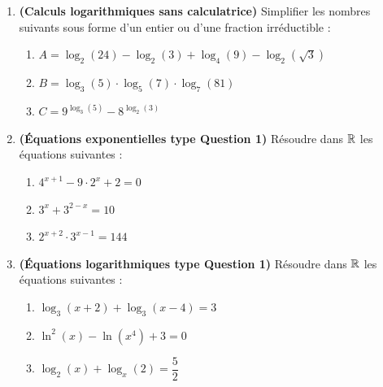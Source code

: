 \begin{enumerate}[label=\textbf{Exercice 3.\arabic* :}, leftmargin=*]
    \item \textbf{(Calculs logarithmiques sans calculatrice)} Simplifier les nombres suivants sous forme d'un entier ou d'une fraction irréductible :
    \begin{enumerate}[label=(\alph*)]
        \item $A = \log_2(24) - \log_2(3) + \log_4(9) - \log_2(\sqrt{3})$
        \item $B = \log_3(5)\cdot\log_5(7)\cdot\log_7(81)$
        \item $C = 9^{\log_3(5)} - 8^{\log_2(3)}$
    \end{enumerate}
    \item \textbf{(Équations exponentielles type Question 1)} Résoudre dans $\mathbb{R}$ les équations suivantes :
    \begin{enumerate}[label=(\alph*)]
        \item $4^{x+1} - 9\cdot 2^x + 2 = 0$
        \item $3^x + 3^{2-x} = 10$
        \item $2^{x+2}\cdot 3^{x-1} = 144$
    \end{enumerate}
    \item \textbf{(Équations logarithmiques type Question 1)} Résoudre dans $\mathbb{R}$ les équations suivantes :
    \begin{enumerate}[label=(\alph*)]
        \item $\log_3(x + 2) + \log_3(x - 4) = 3$
        \item $\ln^2(x) - \ln(x^4) + 3 = 0$
        \item $\log_2(x) + \log_x(2) = \dfrac{5}{2}$
    \end{enumerate}
\end{enumerate}
